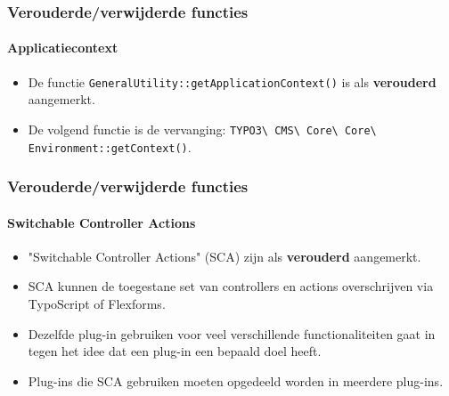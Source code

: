 
\begin{frame}[fragile]
	\frametitle{Verouderde/verwijderde functies}
	\framesubtitle{Applicatiecontext}

	\lstset{basicstyle=\tiny\ttfamily}

	\begin{itemize}
		\item De functie \texttt{GeneralUtility::getApplicationContext()} is als \textbf{verouderd} aangemerkt.
		\item De volgend functie is de vervanging:\newline
		 	\texttt{TYPO3\textbackslash
				CMS\textbackslash
				Core\textbackslash
				Core\textbackslash
				Environment::getContext()}.

	\end{itemize}

\end{frame}


\begin{frame}[fragile]
	\frametitle{Verouderde/verwijderde functies}
	\framesubtitle{Switchable Controller Actions}

	\begin{itemize}
		\item "Switchable Controller Actions" (SCA) zijn als \textbf{verouderd} aangemerkt.
		\item SCA kunnen de toegestane set van controllers en actions overschrijven via TypoScript of Flexforms.
		\item Dezelfde plug-in gebruiken voor veel verschillende functionaliteiten gaat in tegen het idee dat een plug-in een bepaald doel heeft.
		\item Plug-ins die SCA gebruiken moeten opgedeeld worden in meerdere plug-ins.
	\end{itemize}

\end{frame}


